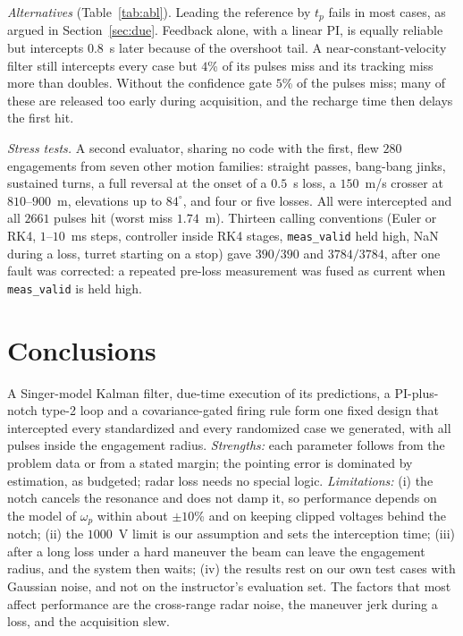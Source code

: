 \documentclass[conference]{IEEEtran}
\begin{document}
\emph{Alternatives} (Table~\ref{tab:abl}). Leading the reference by $t_p$ fails in most cases, as argued in Section~\ref{sec:due}. Feedback alone, with a linear PI, is equally reliable but intercepts $0.8$~s later because of the overshoot tail. A near-constant-velocity filter still intercepts every case but $4$\% of its pulses miss and its tracking miss more than doubles. Without the confidence gate $5$\% of the pulses miss; many of these are released too early during acquisition, and the recharge time then delays the first hit.

\emph{Stress tests.} A second evaluator, sharing no code with the first, flew $280$ engagements from seven other motion families: straight passes, bang-bang jinks, sustained turns, a full reversal at the onset of a $0.5$~s loss, a $150$~m/s crosser at $810$--$900$~m, elevations up to $84^\circ$, and four or five losses. All were intercepted and all $2661$ pulses hit (worst miss $1.74$~m). Thirteen calling conventions (Euler or RK4, $1$--$10$~ms steps, controller inside RK4 stages, \texttt{meas\_valid} held high, NaN during a loss, turret starting on a stop) gave $390/390$ and $3784/3784$, after one fault was corrected: a repeated pre-loss measurement was fused as current when \texttt{meas\_valid} is held high.

\section{Conclusions}
A Singer-model Kalman filter, due-time execution of its predictions, a PI-plus-notch type-2 loop and a covariance-gated firing rule form one fixed design that intercepted every standardized and every randomized case we generated, with all pulses inside the engagement radius. \emph{Strengths:} each parameter follows from the problem data or from a stated margin; the pointing error is dominated by estimation, as budgeted; radar loss needs no special logic. \emph{Limitations:} (i) the notch cancels the resonance and does not damp it, so performance depends on the model of $\omega_p$ within about $\pm10$\% and on keeping clipped voltages behind the notch; (ii) the $1000$~V limit is our assumption and sets the interception time; (iii) after a long loss under a hard maneuver the beam can leave the engagement radius, and the system then waits; (iv) the results rest on our own test cases with Gaussian noise, and not on the instructor's evaluation set. The factors that most affect performance are the cross-range radar noise, the maneuver jerk during a loss, and the acquisition slew.
\end{document}
